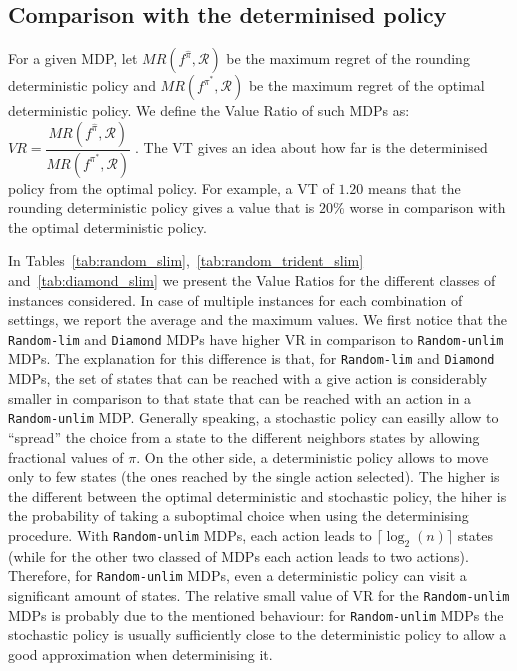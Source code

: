 \subsection{Comparison with the determinised policy}

For a given MDP, let $MR(f^{\hat{\pi}}, \mathcal{R})$ be the maximum regret of the rounding deterministic policy and $MR(f^{\pi^*}, \mathcal{R})$  be the maximum regret of the optimal deterministic policy. We define the Value Ratio of such MDPs as: $VR = \dfrac{MR(f^{\hat{\pi}}, \mathcal{R})}{MR(f^{\pi^*}, \mathcal{R})}\;$.
The VT gives an idea about how far is the determinised policy from the optimal policy. 
For example, a VT of $1.20$ means that the rounding deterministic policy gives a value that is $20\%$ worse in comparison with the optimal deterministic policy. 
%
  
  
  


In Tables~\ref{tab:random_slim},~\ref{tab:random_trident_slim} and~\ref{tab:diamond_slim} we present the Value Ratios for the different classes of instances considered. In case of multiple instances for each combination of settings, we report the average and the maximum values.
%
We first notice that the \texttt{Random-lim} and \texttt{Diamond} MDPs have higher VR in comparison to \texttt{Random-unlim} MDPs. The explanation for this difference is that, for \texttt{Random-lim} and \texttt{Diamond} MDPs, the set of states that can be reached with a give action is considerably smaller in comparison to that state that can be reached with an action in a \texttt{Random-unlim} MDP. 
%
Generally speaking, a stochastic policy can easilly allow to ``spread'' the choice from a state to the different neighbors states by allowing fractional values of $\pi$.
On the other side, a deterministic policy allows to move only to few states (the ones reached by the single action selected). The higher is the different between the optimal deterministic and stochastic policy, the hiher is the probability of taking a suboptimal choice when using the determinising procedure.
%
With \texttt{Random-unlim} MDPs, each action leads to  $\lceil \log_2(n) \rceil$ states (while for the other two classed of MDPs each action leads to two actions). Therefore, for \texttt{Random-unlim} MDPs, even a deterministic policy can visit a significant amount of states.
%
The relative small value of VR for the \texttt{Random-unlim} MDPs is probably due to the mentioned behaviour: for \texttt{Random-unlim} MDPs the stochastic policy is usually sufficiently close to the deterministic policy to allow a good approximation when determinising it. 

